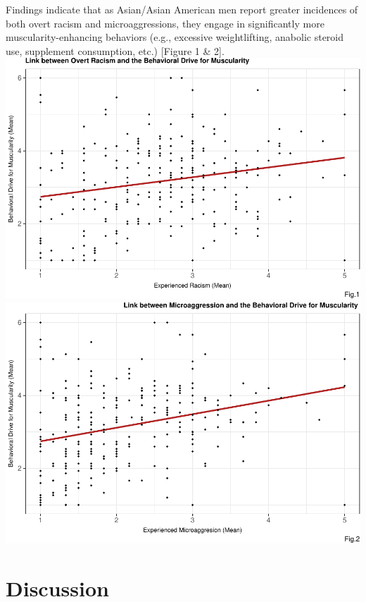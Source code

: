 \documentclass[
  english,
  man, fleqn, noextraspace,floatsintext]{apa6}
\begin{document}
Findings indicate that as Asian/Asian American men report greater incidences of both overt racism and microaggressions, they engage in significantly more muscularity-enhancing behaviors (e.g., excessive weightlifting, anabolic steroid use, supplement consumption, etc.) {[}Figure 1 \& 2{]}.
\includegraphics{final_project_files/figure-latex/ggplot-1.pdf} \includegraphics{final_project_files/figure-latex/ggplot-2.pdf}

\hypertarget{discussion}{%
\section{Discussion}\label{discussion}}
\end{document}

